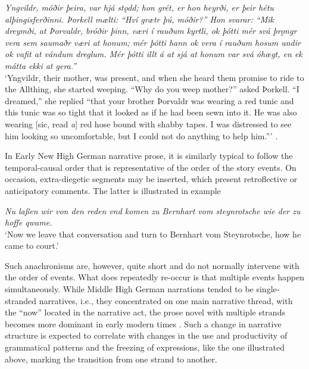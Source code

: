 \documentclass[output=paper,colorlinks,citecolor=brown]{langscibook}
\begin{document}
\ea \label{ex:ch1.1}
{\itshape Yngvildr, móðir þeira, var hjá stǫdd; hon grét, er hon heyrði, er þeir hétu alþingisferðinni. Þorkell mælti: “Hví grætr þú, móðir?” Hon svarar: “Mik dreymði, at Þorvaldr, bróðir þinn, væri í rauðum kyrtli, ok þótti mér svá þrǫngr vera sem saumaðr væri at honum; mér þótti hann ok vera í rauðum hosum undir ok vafit at vándum dreglum. Mér þótti illt á at sjá at honum var svá óhœgt, en ek mátta ekki at gera.”}\\
\glt `Yngvildr, their mother, was present, and when she heard them promise to ride to the Allthing, she started weeping. “Why do you weep mother?” asked Þorkell. “I dreamed,” she replied “that your brother Þorvaldr was wearing a red tunic and this tunic was so tight that it looked as if he had been sewn into it. He was also wearing [sic, read \textit{a}] red hose bound with shabby tapes. I was distressed to see him looking so uncomfortable, but I could not do anything to help him.”' \hfill \citep[51--52]{Loennroth1976}.
\z 

In Early New High German narrative prose, it is similarly typical to follow the temporal-causal order that is representative of the order of the story events. On occasion, extra-diegetic segments may be inserted, which present retroflective or anticipatory comments. The latter is illustrated in example 

\ea \label{ex:ch1.2} {\itshape Nu laßen wir von den reden vnd komen zu Bernhart vom steynrotsche wie der zu hoffe qwame.}\\
\glt `Now we leave that conversation and turn to Bernhart vom Steynrotsche, how he came to court.'\\
 \hfill \citep[Ponthus, 42vb, translation my own]{RokoUP}
\z

\noindent Such anachronisms are, however, quite short and do not normally intervene with the order of events. What does repeatedly re-occur is that multiple events happen simultaneously. While Middle High German narrations tended to be single-stranded narratives, i.e., they concentrated on one main narrative thread, with the “now” located in the narrative act, the prose novel with multiple strands becomes more dominant in early modern times \citep{Zeman2023c}. Such a change in narrative structure is expected to correlate with changes in the use and productivity of grammatical patterns and the freezing of expressions, like the one illustrated above, marking the transition from one strand to another.
\end{document}

